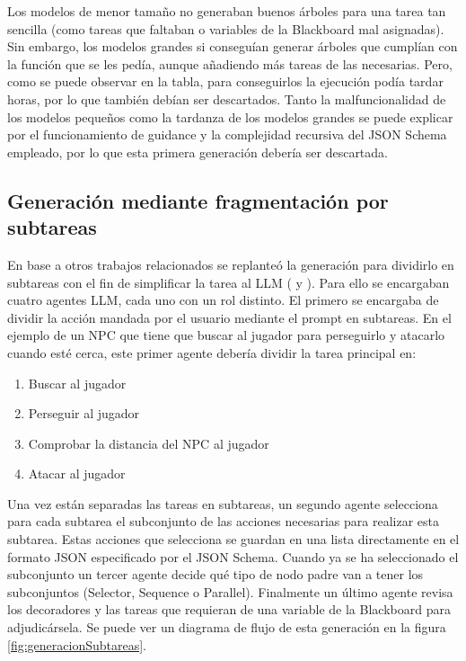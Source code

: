 Los modelos de menor tamaño no generaban buenos árboles para una tarea tan sencilla (como tareas que faltaban o variables de la Blackboard mal asignadas).
Sin embargo, los modelos grandes si conseguían generar árboles que cumplían con la función que se les pedía, aunque añadiendo más tareas de las necesarias.
Pero, como se puede observar en la tabla, para conseguirlos la ejecución podía tardar horas, por lo que también debían ser descartados.
Tanto la malfuncionalidad de los modelos pequeños como la tardanza de los modelos grandes se puede explicar por el funcionamiento de guidance y la complejidad recursiva del JSON Schema empleado, por lo que esta primera generación debería ser descartada.

\subsection{Generación mediante fragmentación por subtareas}
En base a otros trabajos relacionados se replanteó la generación para dividirlo en subtareas con el fin de simplificar la tarea al LLM (\cite{ZKTP} y \cite{ReAcTree}).
Para ello se encargaban cuatro agentes LLM, cada uno con un rol distinto.
El primero se encargaba de dividir la acción mandada por el usuario mediante el prompt en subtareas.
En el ejemplo de un NPC que tiene que buscar al jugador para perseguirlo y atacarlo cuando esté cerca, este primer agente debería dividir la tarea principal en:

\begin{enumerate}
    \item Buscar al jugador
    \item Perseguir al jugador
    \item Comprobar la distancia del NPC al jugador
    \item Atacar al jugador
\end{enumerate}

Una vez están separadas las tareas en subtareas, un segundo agente selecciona para cada subtarea el subconjunto de las acciones necesarias para realizar esta subtarea.
Estas acciones que selecciona se guardan en una lista directamente en el formato JSON especificado por el JSON Schema.
Cuando ya se ha seleccionado el subconjunto un tercer agente decide qué tipo de nodo padre van a tener los subconjuntos (Selector, Sequence o Parallel).
Finalmente un último agente revisa los decoradores y las tareas que requieran de una variable de la Blackboard para adjudicársela.
Se puede ver un diagrama de flujo de esta generación en la figura \ref{fig:generacionSubtareas}.

